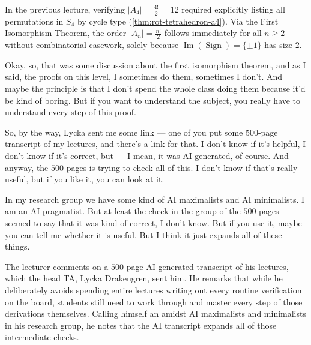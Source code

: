 \begin{proofWrapper}
\begin{content}
\begin{steps}
In the previous lecture, verifying $|A_4| = \frac{4!}{2} = 12$ required explicitly listing all permutations in $S_4$ by cycle type (\cref{thm:rot-tetrahedron-a4}). Via the First Isomorphism Theorem, the order $|A_n| = \frac{n!}{2}$ follows immediately for all $n \ge 2$ without combinatorial casework, solely because $\operatorname{Im}(\operatorname{Sign}) = \{\pm 1\}$ has size $2$.
\end{steps}
\end{content}

\end{proofWrapper}

\begin{speech}[00:14:25 - 00:15:48]
Okay, so, that was some discussion about the first isomorphism theorem, and as I said, the proofs on this level, I sometimes do them, sometimes I don't. And maybe the principle is that I don't spend the whole class doing them because it'd be kind of boring. But if you want to understand the subject, you really have to understand every step of this proof.

So, by the way, Lycka sent me some link --- one of you put some $500$-page transcript of my lectures, and there's a link for that. I don't know if it's helpful, I don't know if it's correct, but --- I mean, it was AI generated, of course. And anyway, the $500$ pages is trying to check all of this. I don't know if that's really useful, but if you like it, you can look at it.

In my research group we have some kind of AI maximalists and AI minimalists. I am an AI pragmatist. But at least the check in the group of the $500$ pages seemed to say that it was kind of correct, I don't know. But if you use it, maybe you can tell me whether it is useful. But I think it just expands all of these things. 
\end{speech}

\begin{note}
The lecturer comments on a $500$-page AI-generated transcript of his lectures, which the head TA, Lycka Drakengren, sent him. He remarks that while he deliberately avoids spending entire lectures writing out every routine verification on the board, students still need to work through and master every step of those derivations themselves. Calling himself an  amidst AI maximalists and minimalists in his research group, he notes that the AI transcript expands all of those intermediate checks.
\end{note}

